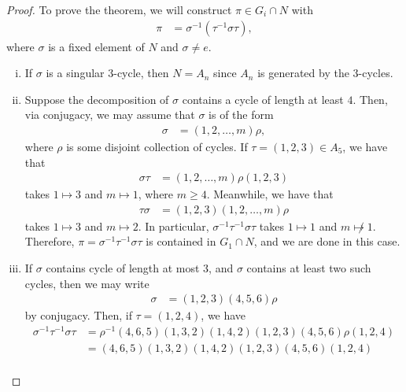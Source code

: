\documentclass[10pt]{mypackage}
\begin{document}
\begin{proof}
  To prove the theorem, we will construct $\pi\in G_i\cap N$ with
  \begin{align*}
    \pi &= \sigma^{-1}\left( \tau^{-1}\sigma\tau \right),
  \end{align*}
  where $\sigma$ is a fixed element of $N$ and $\sigma\neq e$. 
  \begin{enumerate}[(i)]
    \item If $\sigma$ is a singular $3$-cycle, then $N = A_n$ since $A_n$ is generated by the $3$-cycles.
    \item Suppose the decomposition of $\sigma$ contains a cycle of length at least $4$. Then, via conjugacy, we may assume that $\sigma$ is of the form
      \begin{align*}
        \sigma &= \left( 1,2,\dots,m \right)\rho,
      \end{align*}
      where $\rho$ is some disjoint collection of cycles. If $\tau = \left( 1,2,3 \right)\in A_5$, we have that
      \begin{align*}
        \sigma\tau &= \left( 1,2,\dots,m \right)\rho \left( 1,2,3 \right)
      \end{align*}
      takes $1\mapsto 3$ and $m\mapsto 1$, where $m\geq 4$. Meanwhile, we have that
      \begin{align*}
        \tau\sigma &= \left( 1,2,3 \right)\left( 1,2,\dots,m \right)\rho
      \end{align*}
      takes $1\mapsto 3$ and $m\mapsto 2$. In particular, $\sigma^{-1}\tau^{-1}\sigma\tau$ takes $1\mapsto 1$ and $m\not\mapsto 1$. Therefore, $\pi = \sigma^{-1}\tau^{-1}\sigma\tau$ is contained in $G_1\cap N$, and we are done in this case.
    \item If $\sigma$ contains cycle of length at most $3$, and $\sigma$ contains at least two such cycles, then we may write
      \begin{align*}
        \sigma &= \left( 1,2,3 \right)\left( 4,5,6 \right)\rho
      \end{align*}
      by conjugacy. Then, if $\tau = \left( 1,2,4 \right)$, we have
      \begin{align*}
        \sigma^{-1}\tau^{-1}\sigma\tau &= \rho^{-1}\left( 4,6,5 \right)\left( 1,3,2 \right) \left( 1,4,2 \right)\left( 1,2,3 \right)\left( 4,5,6 \right)\rho\left( 1,2,4 \right)\\
                                       &= \left( 4,6,5 \right)\left( 1,3,2 \right)\left( 1,4,2 \right)\left( 1,2,3 \right)\left( 4,5,6 \right)\left( 1,2,4 \right)\\

\end{align*}
\end{enumerate}
\end{proof}
\end{document}
